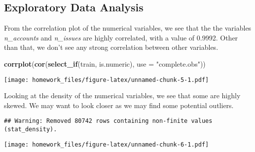 \documentclass[]{article}
\newenvironment{Shaded}{\begin{snugshade}}{\end{snugshade}}
\newcommand{\KeywordTok}[1]{\textcolor[rgb]{0.13,0.29,0.53}{\textbf{#1}}}
\newcommand{\DataTypeTok}[1]{\textcolor[rgb]{0.13,0.29,0.53}{#1}}
\newcommand{\StringTok}[1]{\textcolor[rgb]{0.31,0.60,0.02}{#1}}
\newcommand{\OperatorTok}[1]{\textcolor[rgb]{0.81,0.36,0.00}{\textbf{#1}}}
\newcommand{\NormalTok}[1]{#1}
\begin{document}
\hypertarget{exploratory-data-analysis}{\subsection{Exploratory Data
Analysis}\label{exploratory-data-analysis}}

From the correlation plot of the numerical variables, we see that the
the variables \emph{n\_accounts} and \emph{n\_issues} are highly
correlated, with a value of 0.9992. Other than that, we don't see any
strong correlation between other variables.

\begin{Shaded}
\begin{Highlighting}[]
\KeywordTok{corrplot}\NormalTok{(}\KeywordTok{cor}\NormalTok{(}\KeywordTok{select_if}\NormalTok{(train, is.numeric), }\DataTypeTok{use =} \StringTok{"complete.obs"}\NormalTok{))}
\end{Highlighting}
\end{Shaded}

\texttt{[image: homework\_files/figure-latex/unnamed-chunk-5-1.pdf]}

Looking at the density of the numerical variables, we see that some are
highly skewed. We may want to look closer as we may find some potential
outliers.

\begin{Shaded}
\end{Shaded}

\begin{verbatim}
## Warning: Removed 80742 rows containing non-finite values (stat_density).
\end{verbatim}

\texttt{[image: homework\_files/figure-latex/unnamed-chunk-6-1.pdf]}

\begin{Shaded}
\end{Shaded}
\end{document}
